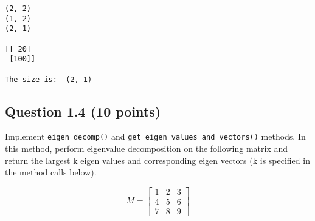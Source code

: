 \documentclass[11pt]{article}
\begin{document}
    \begin{Verbatim}[commandchars=\\\{\}]
(2, 2)
(1, 2)
(2, 1)

[[ 20]
 [100]]

The size is:  (2, 1)
    \end{Verbatim}

    \hypertarget{question-1.4-10-points}{%
\subsection{Question 1.4 (10 points)}\label{question-1.4-10-points}}

Implement \texttt{eigen\_decomp()} and
\texttt{get\_eigen\_values\_and\_vectors()} methods. In this method,
perform eigenvalue decomposition on the following matrix and return the
largest k eigen values and corresponding eigen vectors (k is specified
in the method calls below).

\[M = \begin{bmatrix}
1 & 2 & 3 \\
4 & 5 & 6 \\
7 & 8 & 9 \end{bmatrix}
\]
\end{document}
